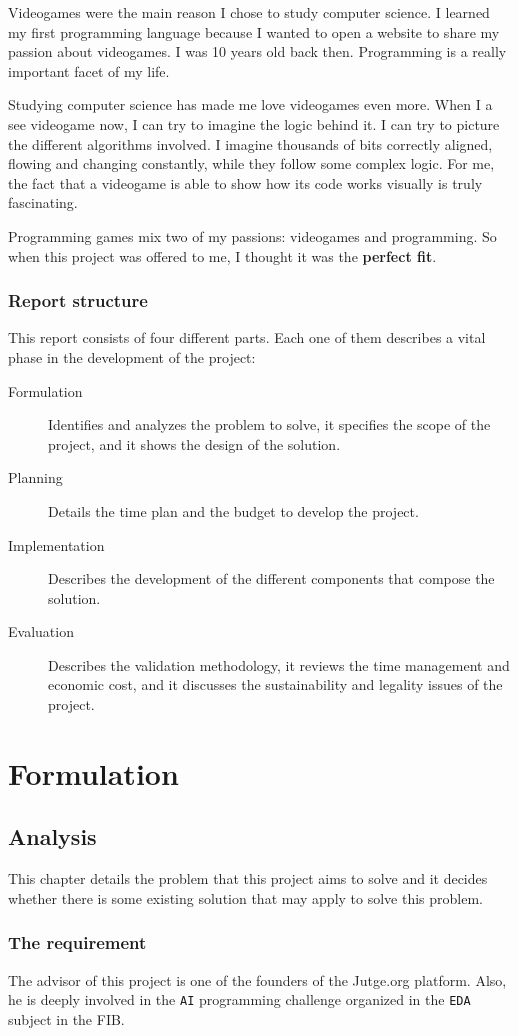 \documentclass[a4paper,11pt,titlepage,abstract,numbers=noenddot,automark,mnsy,intlimits,rgb,dvipsnames]{report}
\begin{document}
Videogames were the main reason I chose to study computer science. I learned my first
programming language because I wanted to open a website
to share my passion about videogames. I was 10 years old back then. Programming is a really important
facet of my life.

Studying computer science has made me love videogames even more. When I a see videogame now, I can try to
imagine the logic
behind it. I can try to picture the different algorithms involved. I imagine thousands of bits correctly aligned,
flowing and changing constantly, while they follow some complex logic. For me, the fact that a videogame is
able to show how its code works visually is truly fascinating.

Programming games mix two of my passions: videogames and programming. So when this project was offered to me,
I thought it was the \textbf{perfect fit}.
\section{Report structure}
This report consists of four different parts. Each one of them describes a vital phase in the development of
the project:
\begin{description}
\item[Formulation]
Identifies and analyzes the problem to solve, it specifies the scope of
  the project, and it shows the design of the solution.
\item[Planning]
Details the time plan and the budget to develop the project.
\item[Implementation]
Describes the development of the different components that compose the solution.
\item[Evaluation]
Describes the validation methodology, it reviews the time management and economic cost,
  and it discusses the sustainability and legality issues of the project.
\end{description}
\part{Formulation}
\chapter{Analysis}
This chapter details the problem that this project aims to solve and it decides whether there is some existing
solution that may apply to solve this problem.
\section{The requirement}
\label{requirement}
The advisor of this project is one of the founders of the Jutge.org platform. Also, he is deeply involved in the \texttt{AI}
programming challenge organized in the \texttt{EDA} subject in the FIB.
\end{document}
